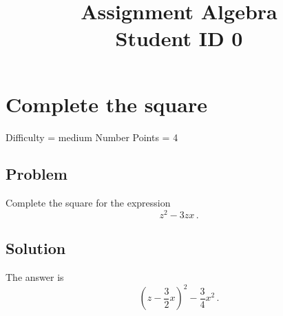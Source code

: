 \documentclass{article}
\title{Assignment Algebra \\ Student ID 0}
\begin{document}
\maketitle

\section{Complete the square}
Difficulty = medium
Number Points = 4
\subsection{Problem}
Complete the square for the expression $$ z^2 - 3zx \,.$$
\subsection{Solution}
The answer is $$(z-\frac 32 x )^{2} - \frac 34 x^2 \,.$$
\end{document}
